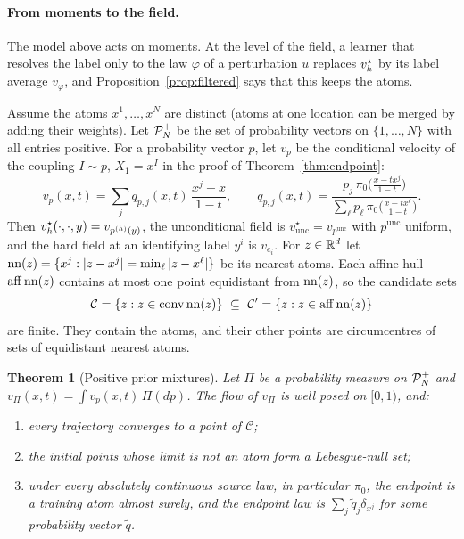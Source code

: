 \documentclass{article}
\theoremstyle{plain}
\newtheorem{theorem}{Theorem}
\theoremstyle{remark}
\begin{document}
\paragraph{From moments to the field.} The model above acts on moments. At the level of
the field, a learner that resolves the label only to the law $\varphi$ of a perturbation
$u$ replaces $v_h^\star$ by its label average $v_\varphi$, and Proposition~\ref{prop:filtered} says that this keeps the atoms.

Assume the atoms $x^1,\dots,x^N$ are distinct (atoms at one location can be merged by
adding their weights). Let $\mathcal{P}_N^{+}$ be the set of probability vectors on $\{1,\dots,N\}$
with all entries positive. For a probability vector $p$, let $v_p$ be the conditional
velocity of the coupling $I\sim p$, $X_1=x^I$ in the proof of Theorem~\ref{thm:endpoint}:
\begin{equation}
v_p(x,t)=\sum_j q_{p,j}(x,t)\,\frac{x^j-x}{1-t},\qquad
q_{p,j}(x,t)=\frac{p_j\,\pi_0\big(\tfrac{x-tx^j}{1-t}\big)}
{\sum_\ell p_\ell\,\pi_0\big(\tfrac{x-tx^\ell}{1-t}\big)}.
\label{eq:prior-field}
\end{equation}
Then $v_h^\star(\cdot,\cdot,y)=v_{p^{(h)}(y)}$, the unconditional field is
$v_{\mathrm{unc}}^\star=v_{p^{\mathrm{unc}}}$ with $p^{\mathrm{unc}}$ uniform, and the hard field
at an identifying label $y^i$ is $v_{e_i}$. For $z\in\mathbb{R}^d$ let
$\operatorname{nn}(z)=\{x^j:|z-x^j|=\min_\ell|z-x^\ell|\}$ be its nearest atoms. Each affine hull
$\operatorname{aff}\operatorname{nn}(z)$ contains at most one point equidistant from $\operatorname{nn}(z)$, so the
candidate sets
\[
\mathcal C=\{z:z\in\operatorname{conv}\operatorname{nn}(z)\}\ \subseteq\
\mathcal C'=\{z:z\in\operatorname{aff}\operatorname{nn}(z)\}
\]
are finite. They contain the atoms, and their other points are circumcentres of sets of
equidistant nearest atoms.

\begin{theorem}[Positive prior mixtures]
\label{thm:posmix}
Let $\Pi$ be a probability measure on $\mathcal{P}_N^{+}$ and $v_\Pi(x,t)=\int v_p(x,t)\,\Pi(dp)$. The
flow of $v_\Pi$ is well posed on $[0,1)$, and:
\begin{enumerate}[label=(\alph*),leftmargin=2em]
\item every trajectory converges to a point of $\mathcal C$;
\item the initial points whose limit is not an atom form a Lebesgue-null set;
\item under every absolutely continuous source law, in particular $\pi_0$, the endpoint is a
  training atom almost surely, and the endpoint law is $\sum_j\tilde q_j\delta_{x^j}$ for
  some probability vector $\tilde q$.
\end{enumerate}
\end{theorem}
\end{document}
